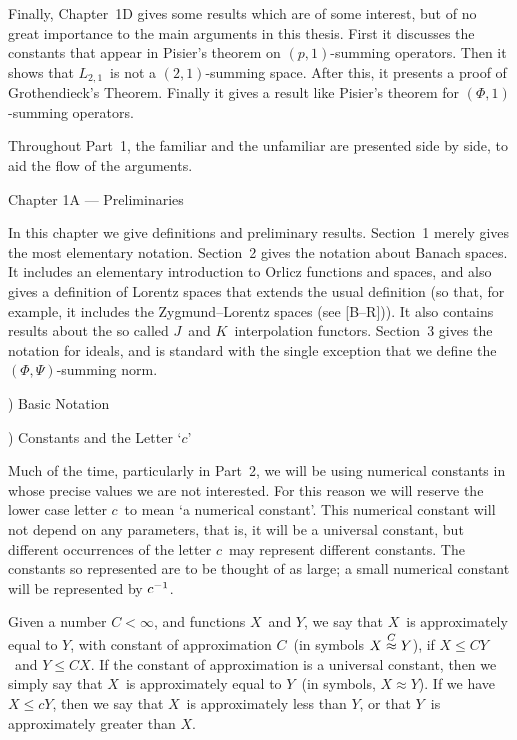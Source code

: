 Finally, Chapter~1D gives some results which are of some interest,
but of no
great importance to the main arguments in this thesis. First it discusses
the
constants that appear in Pisier's theorem on $(p,1)$-summing operators.
Then it
shows that $L_{2,1}$\ is not a $(2,1)$-summing space. After this,
it presents a
proof of Grothendieck's Theorem. Finally it gives a result like Pisier's
theorem
for $(\Phi,1)$-summing operators.
 
Throughout Part~1, the familiar and the unfamiliar are presented
side by side,
to aid the flow of the arguments.
 
\vfill
\eject
 
\beginsection Chapter 1A --- Preliminaries
 
In this chapter we give definitions and preliminary results.
Section~1 merely gives the most elementary notation. Section~2 gives
the
notation about Banach spaces. It includes an elementary introduction
to Orlicz
functions and spaces, and also gives a definition of Lorentz spaces
that
extends the usual definition (so that, for example, it includes the
Zygmund--Lorentz spaces (see [B--R])). It also contains results about
the so
called $J$\ and $K$\ interpolation functors. Section~3 gives the
notation for
ideals, and is standard with the single exception that we define
the
$(\Phi,\Psi)$-summing norm.
 
) Basic Notation
 
) Constants and the Letter `$c$'
 
Much of the time, particularly in Part~2, we will be using numerical
constants
in whose precise values we are not interested. For this reason we
will reserve
the lower case letter $c$\ to mean `a numerical constant'. This numerical
constant will not depend on any parameters, that is, it will be a
universal
constant, but different occurrences of the letter $c$\ may represent
different
constants. The constants so represented are to be thought of as large;
a small
numerical constant will be represented by $c^{-1}$.
 
Given a number $C<\infty$, and functions $X$\ and $Y$, we say that
{\dt $X$\ is
approximately equal to $Y$, with constant of approximation $C$}\
(in symbols $X
\labelledapprox C Y$), if $X\le CY$\ and $Y\le CX$. If the constant
of
approximation is a universal constant, then we simply say that $X$\
is {\dt
approximately equal to} $Y$\ (in symbols, $X\approx Y$). If we have
$X\le cY$,
then we say that $X$\ is {\dt approximately less than} $Y$, or that
$Y$\ is
{\dt approximately greater than} $X$.
 

